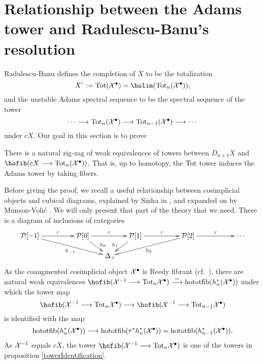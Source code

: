 \documentclass[11pt]{amsart}
\theoremstyle{plain}
\begin{document}
\section{Relationship between the Adams tower and Radulescu-Banu's resolution}\label{sec:relnWithRB}

Radulescu-Banu defines the completion of $X$ to be the totalization
\[X\hat{\ }:=\textup{Tot}(\calX^\bullet)=\holim (\textup{Tot}_n(\calX^\bullet)),\]
and the unstable Adams spectral sequence to be the spectral sequence of the tower
\[\cdots \longrightarrow\textup{Tot}_n(\mathcal{X}^\bullet)\longrightarrow \textup{Tot}_{n-1}(\mathcal{X}^\bullet)\longrightarrow\cdots \]
under $cX$. Our goal in this section is to prove
\begin{prop}\label{towerIdentification}
There is a natural zig-zag of weak equivalences of towers between $D_{n+1}X$ and $\hofib(cX\to\textup{Tot}_{n}(\calX^\bullet))$. That is, up to homotopy, the $\textup{Tot}$ tower induces the Adams tower by taking fibers.
\end{prop}
Before giving the proof, we recall a useful relationship between cosimplicial objects and cubical diagrams, explained by Sinha in \cite[Theorem 6.5]{SinhaSpacesOfKnots.pdf}, and expanded on by Munson-Voli\'c \cite{CubicalHomotopyTheory.pdf}.
We will only present that part of the theory that we need. There is a diagram of inclusions of categories
\[\xymatrix@!0@R=10mm@C=13mm{
\calP[-1]\ar[rr]^-{\tau}\ar_-{h_{-1}}[drrr]
&&%
\calP[0]\ar[rr]^-{\tau}\ar^(.65){\!h_{0}}[dr]
&&%
\calP[1]\ar[rr]^-{\tau}\ar_(.65){h_{1}\!}[dl]
&&%
\calP[2]\ar[rr]^-{\tau}\ar^-{h_{2}}[dlll]
&&%
\cdots \\
&&&\Delta_+\!\!
}\]
As the coaugmented cosimplicial object $\mathcal{X}^\bullet$ is Reedy fibrant (cf.\ \cite[{X.4.9}]{YellowMonster}), there are natural weak equivalences $\hofib(\calX^{-1}\to\textup{Tot}_n\calX^\bullet) \overset{\smash{\sim}}{\to} \textup{hototfib}(h_n^*(\calX^\bullet))$ under which the tower map 
\[\hofib(\calX^{-1}\to\textup{Tot}_n\calX^\bullet)\to \hofib(\calX^{-1}\to\textup{Tot}_{n-1}\calX^\bullet)\]
is identified with the map
\[\textup{hototfib}(h_n^*(\mathcal{X}^\bullet))\longrightarrow \textup{hototfib}(\tau^*h_n^*(\mathcal{X}^\bullet))=\textup{hototfib}(h_{n-1}^*(\mathcal{X}^\bullet)).\]
As $\mathcal{X}^{-1}$ equals $cX$, the tower $\hofib(\calX^{-1}\to\textup{Tot}_n\calX^{\bullet})$ is one of the towers in proposition \ref{towerIdentification}.
\end{document}
